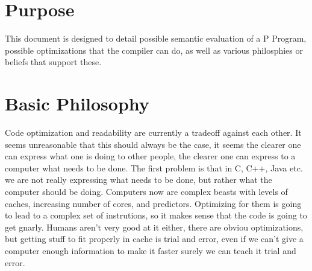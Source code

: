 %
%
%
%
\section{Purpose}
This document is designed to detail possible semantic evaluation of a P Program, possible optimizations that the compiler can do, as well as various philosphies or 
beliefs that support these.
\section{Basic Philosophy}
Code optimization and readability are currently a tradeoff against each other. It seems unreasonable that this should always be the case, it seems the clearer one can 
express what one is doing to other people, the clearer one can express to a computer what needs to be done. The first problem is that in C, C++, Java etc. we are not 
really expressing what needs to be done, but rather what the computer should be doing. Computers now are complex beasts with levels of caches, increasing number of cores, 
and predictors. Optimizing for them is going to lead to a complex set of instrutions, so it makes sense that the code is going to get gnarly. Humans aren't very good at 
it either, there are obviou optimizations, but getting stuff to fit properly in cache is trial and error, even if we can't give a computer enough information to make it 
faster surely we can teach it trial and error.

